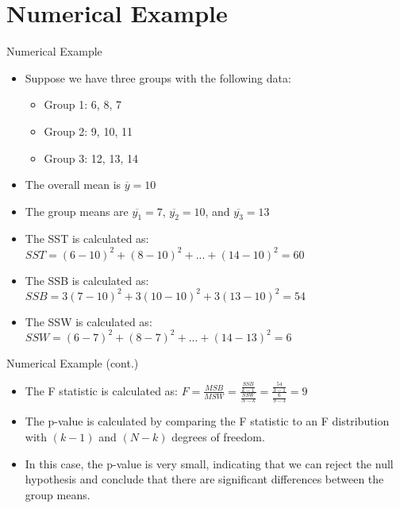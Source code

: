 \documentclass{beamer}
\begin{document}
\section{Numerical Example}
\begin{frame}{Numerical Example}
  \begin{itemize}
      \item Suppose we have three groups with the following data:
      \begin{itemize}
          \item Group 1: 6, 8, 7
          \item Group 2: 9, 10, 11
          \item Group 3: 12, 13, 14
      \end{itemize}
      \item The overall mean is $\overline{y} = 10$
      \item The group means are $\overline{y_1} = 7$, $\overline{y_2} = 10$, and $\overline{y_3} = 13$
      \item The SST is calculated as: $SST = (6-10)^2 + (8-10)^2 + ... + (14-10)^2 = 60$
      \item The SSB is calculated as: $SSB = 3(7-10)^2 + 3(10-10)^2 + 3(13-10)^2 = 54$
      \item The SSW is calculated as: $SSW = (6-7)^2 + (8-7)^2 + ... + (14-13)^2 = 6$
  \end{itemize}
\end{frame}

\begin{frame}{Numerical Example (cont.)}


  \begin{itemize}
    \item The F statistic is calculated as: $F = \frac{MSB}{MSW} = \frac{\frac{SSB}{k-1}}{\frac{SSW}{N-k}} = \frac{\frac{54}{3-1}}{\frac{6}{9-3}} = 9$
    \item The p-value is calculated by comparing the F statistic to an F distribution with $(k-1)$ and $(N-k)$ degrees of freedom.
    \item In this case, the p-value is very small, indicating that we can reject the null hypothesis and conclude that there are significant differences between the group means.
\end{itemize}
\end{frame}
\end{document}
